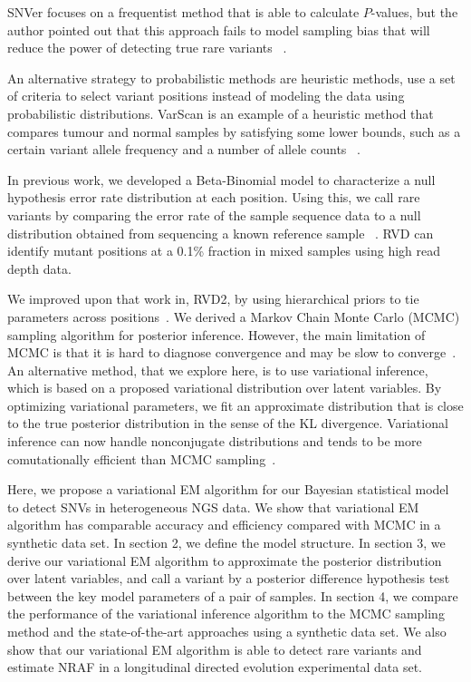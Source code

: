 \documentclass[11pt,reqno]{amsart}
\begin{document}
SNVer focuses on a frequentist method that is able to calculate $P$-values, but the author pointed out that this approach fails to model sampling bias that will reduce the power of detecting true rare variants ~\citep{wei2011snver}.

An alternative strategy to probabilistic methods are heuristic methods, use a set of criteria to select variant positions instead of modeling the data using probabilistic distributions.
VarScan is an example of a heuristic method that compares tumour and normal samples by satisfying some lower bounds, such as a certain variant allele frequency and a number of allele counts ~\citep{koboldt2012varscan}.

In previous work, we developed a Beta-Binomial model to characterize a null hypothesis error rate distribution at each position.
Using this, we call rare variants by comparing the error rate of the sample sequence data to a null distribution obtained from sequencing a known reference sample ~\citep{flaherty2011ultrasensitive}.
RVD can identify mutant positions at a 0.1\% fraction in mixed samples using high read depth data.

We improved upon that work in, RVD2, by using hierarchical priors to tie parameters across positions~\citep{he2015rvd2}.
We derived a Markov Chain Monte Carlo (MCMC) sampling algorithm for posterior inference.
However, the main limitation of MCMC is that it is hard to diagnose convergence and may be slow to converge~\citep{jordan1999introduction}.
An alternative method, that we explore here, is to use variational inference, which is based on a proposed variational distribution over latent variables.
By optimizing variational parameters, we fit an approximate distribution that is close to the true posterior distribution in the sense of the KL divergence.
Variational inference can now handle nonconjugate distributions and tends to be more comutationally efficient than MCMC sampling~\citep{peterson1989explorations}.

Here, we propose a variational EM algorithm for our Bayesian statistical model to detect SNVs in heterogeneous NGS data.
We show that variational EM algorithm has comparable accuracy and efficiency compared with MCMC in a synthetic data set.
In section 2, we define the model structure.
In section 3, we derive our variational EM algorithm to approximate the posterior distribution over latent variables, and call a variant by a posterior difference hypothesis test between the key model parameters of a pair of samples.
In section 4, we compare the performance of the variational inference algorithm to the MCMC sampling method and the state-of-the-art approaches using a synthetic data set.
We also show that our variational EM algorithm is able to detect rare variants and estimate NRAF in a longitudinal directed evolution experimental data set.
\end{document}
